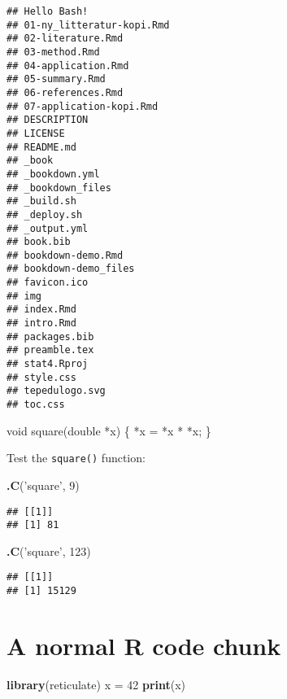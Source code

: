 \documentclass[]{book}
\newenvironment{Shaded}{\begin{snugshade}}{\end{snugshade}}
\newcommand{\DataTypeTok}[1]{\textcolor[rgb]{0.13,0.29,0.53}{#1}}
\newcommand{\DecValTok}[1]{\textcolor[rgb]{0.00,0.00,0.81}{#1}}
\newcommand{\KeywordTok}[1]{\textcolor[rgb]{0.13,0.29,0.53}{\textbf{#1}}}
\newcommand{\NormalTok}[1]{#1}
\newcommand{\StringTok}[1]{\textcolor[rgb]{0.31,0.60,0.02}{#1}}
\theoremstyle{definition}
\theoremstyle{definition}
\theoremstyle{definition}
\theoremstyle{remark}
\begin{document}
\begin{verbatim}
## Hello Bash!
## 01-ny_litteratur-kopi.Rmd
## 02-literature.Rmd
## 03-method.Rmd
## 04-application.Rmd
## 05-summary.Rmd
## 06-references.Rmd
## 07-application-kopi.Rmd
## DESCRIPTION
## LICENSE
## README.md
## _book
## _bookdown.yml
## _bookdown_files
## _build.sh
## _deploy.sh
## _output.yml
## book.bib
## bookdown-demo.Rmd
## bookdown-demo_files
## favicon.ico
## img
## index.Rmd
## intro.Rmd
## packages.bib
## preamble.tex
## stat4.Rproj
## style.css
## tepedulogo.svg
## toc.css
\end{verbatim}

\begin{Shaded}
\begin{Highlighting}[]
\DataTypeTok{void}\NormalTok{ square(}\DataTypeTok{double}\NormalTok{ *x) \{}
\NormalTok{  *x = *x * *x;}
\NormalTok{\}}
\end{Highlighting}
\end{Shaded}

Test the \texttt{square()} function:

\begin{Shaded}
\begin{Highlighting}[]
\KeywordTok{.C}\NormalTok{(}\StringTok{'square'}\NormalTok{, }\DecValTok{9}\NormalTok{)}
\end{Highlighting}
\end{Shaded}

\begin{verbatim}
## [[1]]
## [1] 81
\end{verbatim}

\begin{Shaded}
\begin{Highlighting}[]
\KeywordTok{.C}\NormalTok{(}\StringTok{'square'}\NormalTok{, }\DecValTok{123}\NormalTok{)}
\end{Highlighting}
\end{Shaded}

\begin{verbatim}
## [[1]]
## [1] 15129
\end{verbatim}

\hypertarget{a-normal-r-code-chunk}{%
\section{A normal R code chunk}\label{a-normal-r-code-chunk}}

\begin{Shaded}
\begin{Highlighting}[]
\KeywordTok{library}\NormalTok{(reticulate)}
\NormalTok{x =}\StringTok{ }\DecValTok{42}
\KeywordTok{print}\NormalTok{(x)}
\end{Highlighting}
\end{Shaded}
\end{document}
